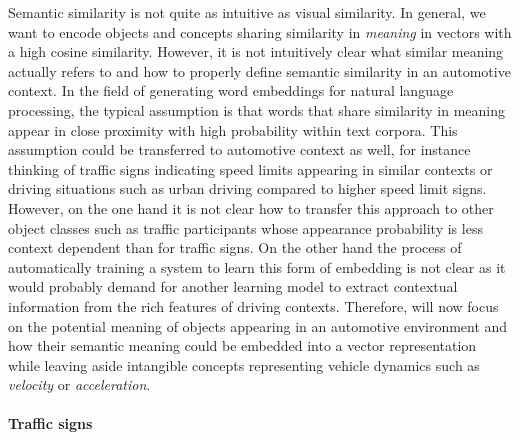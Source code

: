 Semantic similarity is not quite as intuitive as visual similarity. 
In general, we want to encode objects and concepts sharing similarity in \emph{meaning} in vectors with a high cosine similarity.
However, it is not intuitively clear what similar meaning actually refers to and how to properly define semantic similarity in an automotive context.
In the field of generating word embeddings for natural language processing, the typical assumption is that words that share similarity in meaning appear in close proximity with high probability within text corpora.
This assumption could be transferred to automotive context as well, for instance thinking of traffic signs indicating speed limits appearing in similar contexts or driving situations such as urban driving compared to higher speed limit signs.
However, on the one hand it is not clear how to transfer this approach to other object classes such as traffic participants whose appearance probability is less context dependent than for traffic signs. 
On the other hand the process of automatically training a system to learn this form of embedding is not clear as it would probably demand for another learning model to extract contextual information from the rich features of driving contexts.
Therefore, will now focus on the potential meaning of objects appearing in an automotive environment and how their semantic meaning could be embedded into a vector representation while leaving aside intangible concepts representing vehicle dynamics such as \emph{velocity} or \emph{acceleration}.

\paragraph{Traffic signs}%
\label{par:traffic_signs}

